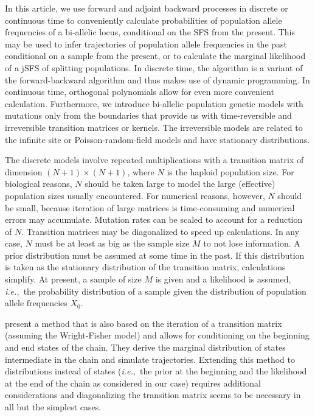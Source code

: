 \documentclass[preprint]{elsarticle}
\newcommand\ie{{\it i.e.,}}
\newcommand\x[1]{\ensuremath{X_{#1}}}
\begin{document}
In this article, we use forward and adjoint backward processes in discrete or continuous time to conveniently calculate probabilities of population allele frequencies of a bi-allelic locus, conditional on the SFS from the present. This may be used to infer trajectories of population allele frequencies in the past conditional on a sample from the present, or to calculate the marginal likelihood of a jSFS of splitting populations. In discrete time, the algorithm is a variant of the forward-backward algorithm and thus makes use of dynamic programming. In continuous time, orthogonal polynomials allow for even more convenient calculation. Furthermore, we introduce bi-allelic population genetic models with mutations only from the boundaries that provide us with time-reversible and irreversible transition matrices or kernels. The irreversible models are related to the infinite site \citep{Kimu69,Evan07} or Poisson-random-field models \citep{Sawy92} and have stationary distributions.

The discrete models involve repeated multiplications with a transition matrix of dimension $(N+1)\times(N+1)$, where $N$ is the haploid population size. For biological reasons, $N$ should be taken large to model the large (effective) population sizes usually encountered. For numerical reasons, however, $N$ should be small, because iteration of large matrices is time-consuming and numerical errors may accumulate. Mutation rates can be scaled to account for a reduction of $N$. Transition matrices may be diagonalized to speed up calculations. In any case, $N$ must be at least as big as the sample size $M$ to not lose information. A prior distribution must be assumed at some time in the past. If this distribution is taken as the stationary distribution of the transition matrix, calculations simplify. At present, a sample of size $M$ is given and a likelihood is assumed, \ie\ the probability distribution of a sample given the distribution of population allele frequencies $\x{0}$.

\citet{Zhao14} present a method that is also based on the iteration of a transition matrix (assuming the Wright-Fisher model) and allows for conditioning on the beginning and end states of the chain. They derive the marginal distribution of states intermediate in the chain and simulate trajectories. Extending this method to distributions instead of states (\ie\ the prior at the beginning and the likelihood at the end of the chain as considered in our case) requires additional considerations and diagonalizing the transition matrix seems to be necessary in all but the simplest cases. 
\end{document}
